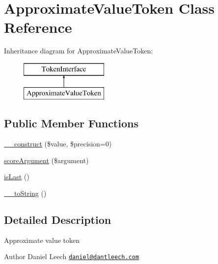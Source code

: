 \hypertarget{class_prophecy_1_1_argument_1_1_token_1_1_approximate_value_token}{}\section{Approximate\+Value\+Token Class Reference}
\label{class_prophecy_1_1_argument_1_1_token_1_1_approximate_value_token}
Inheritance diagram for Approximate\+Value\+Token\+:\begin{figure}[H]
\begin{center}
\leavevmode
\includegraphics[height=2.000000cm]{class_prophecy_1_1_argument_1_1_token_1_1_approximate_value_token}
\end{center}
\end{figure}
\subsection*{Public Member Functions}
\begin{DoxyCompactItemize}
\item 
\mbox{\hyperlink{class_prophecy_1_1_argument_1_1_token_1_1_approximate_value_token_ac13fc1d330e18b3035694a26b7486379}{\+\_\+\+\_\+construct}} (\$value, \$precision=0)
\item 
\mbox{\hyperlink{class_prophecy_1_1_argument_1_1_token_1_1_approximate_value_token_a8d5bf47ab6eaa935458d5ad160e52822}{score\+Argument}} (\$argument)
\item 
\mbox{\hyperlink{class_prophecy_1_1_argument_1_1_token_1_1_approximate_value_token_ac72b8349b1340887fc1af30eca2b951c}{is\+Last}} ()
\item 
\mbox{\hyperlink{class_prophecy_1_1_argument_1_1_token_1_1_approximate_value_token_a7516ca30af0db3cdbf9a7739b48ce91d}{\+\_\+\+\_\+to\+String}} ()
\end{DoxyCompactItemize}


\subsection{Detailed Description}
Approximate value token

\begin{DoxyAuthor}{Author}
Daniel Leech \href{mailto:daniel@dantleech.com}{\tt daniel@dantleech.\+com} 
\end{DoxyAuthor}


